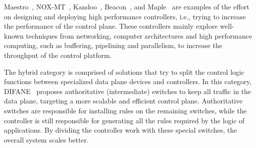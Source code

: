 %

Maestro~\cite{cai2011},
NOX-MT~\cite{tootoonchian2012},
Kandoo~\cite{yeganeh2012},
Beacon~\cite{erickson2013}, and
Maple~\cite{voellmy2013}
are examples of the effort on designing and deploying high performance controllers, i.e., trying to increase the performance of the control plane.
These controllers mainly explore well-known techniques from networking, computer architectures and high performance computing, such as buffering, pipelining and parallelism, to increase the throughput of the control platform.

The hybrid category is comprised of solutions that try to split the control logic functions between specialized data plane devices and controllers. 
In this category, DIFANE~\cite{yu2010-1} proposes authoritative 
(intermediate) switches to keep all traffic in the data plane, targeting a more scalable and efficient control plane. 
Authoritative switches are responsible for installing rules on the remaining switches, while the controller 
is still responsible for generating all the rules required by the logic of applications.
By dividing the controller work with these special switches, the overall system scales better.
 
